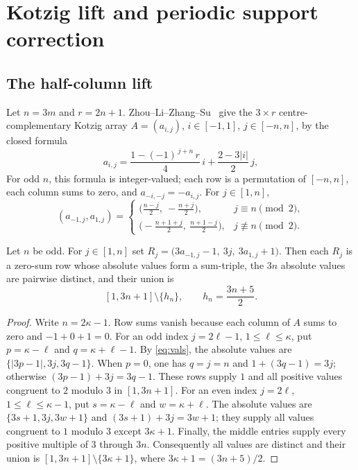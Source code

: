 \section{Kotzig lift and periodic support correction}\label{sec:construction}

\subsection{The half-column lift}

Let $n=3m$ and $r=2n+1$. Zhou--Li--Zhang--Su~\cite[Theorem~2.2]{Zhou2018DM} give the $3\times r$
centre-complementary Kotzig array $A=(a_{i,j})$, $i\in[-1,1]$, $j\in[-n,n]$, by the closed formula
\begin{equation}\label{eq:kotzig}
 a_{i,j}=\frac{1-(-1)^{\,j+n}\,r}{4}\,i+\frac{2-3|i|}{2}\,j ,
\end{equation}
For odd $n$, this formula is integer-valued; each row is a permutation of $[-n,n]$, each column sums
to zero, and $a_{-i,-j}=-a_{i,j}$. For
$j\in[1,n]$,
\begin{equation}\label{eq:vals}
(a_{-1,j},a_{1,j})=
\begin{cases}
\bigl(\tfrac{n-j}{2},\ -\tfrac{n+j}{2}\bigr), & j\equiv n\pmod2,\\[3pt]
\bigl(-\tfrac{n+1+j}{2},\ \tfrac{n+1-j}{2}\bigr), & j\not\equiv n\pmod2 .
\end{cases}
\end{equation}

\begin{proposition}\label{prop:lift}
Let $n$ be odd. For $j\in[1,n]$ set
$R_j=\bigl(3a_{-1,j}-1,\ 3j,\ 3a_{1,j}+1\bigr)$. Then each $R_j$ is a zero-sum row whose absolute
values form a sum-triple, the $3n$ absolute values are pairwise distinct, and their union is
\[
 [1,3n+1]\setminus\{h_n\},\qquad h_n=\frac{3n+5}{2}.
\]
\end{proposition}
\begin{proof}
Write $n=2\kappa-1$. Row sums vanish because each column of $A$ sums to zero and
$-1+0+1=0$. For an odd index $j=2\ell-1$, $1\le\ell\le\kappa$, put
$p=\kappa-\ell$ and $q=\kappa+\ell-1$. By \eqref{eq:vals}, the absolute values are
$\{|3p-1|,3j,3q-1\}$. When $p=0$, one has $q=j=n$ and $1+(3q-1)=3j$; otherwise
$(3p-1)+3j=3q-1$. These rows supply $1$ and all positive values congruent to $2$ modulo $3$ in
$[1,3n+1]$. For an even index $j=2\ell$, $1\le\ell\le\kappa-1$, put
$s=\kappa-\ell$ and $w=\kappa+\ell$. The absolute values are
$\{3s+1,3j,3w+1\}$ and $(3s+1)+3j=3w+1$; they supply all values congruent to $1$ modulo $3$ except
$3\kappa+1$. Finally, the middle entries supply every positive multiple of $3$ through $3n$.
Consequently all values are distinct and their union is
$[1,3n+1]\setminus\{3\kappa+1\}$, where $3\kappa+1=(3n+5)/2$.
\end{proof}

